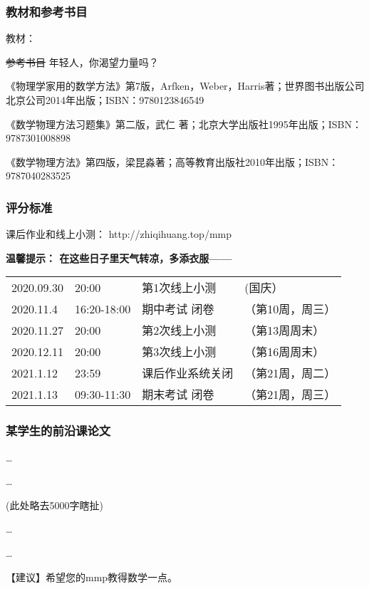 \documentclass[CJK,13pt]{beamer}
\date{}
\begin{document}
  \bch
{}


\begin{frame}
\frametitle{教材和参考书目}

教材：

\skiplines

\sout{参考书目} 年轻人，你渴望力量吗？
\bitem
\item{《物理学家用的数学方法》第7版，Arfken，Weber，Harris著；世界图书出版公司北京公司2014年出版；ISBN：9780123846549}
\item{《数学物理方法习题集》第二版，武仁 著；北京大学出版社1995年出版；ISBN：9787301008898}
\item{《数学物理方法》第四版，梁昆淼著；高等教育出版社2010年出版；ISBN：9787040283525}
\eitem
      
\end{frame}




\begin{frame}
\frametitle{评分标准}


\skipline

课后作业和线上小测： http://zhiqihuang.top/mmp

\skipline

{\bf 温馨提示： 在这些日子里天气转凉，多添衣服——}

\skipline
{\small 
\begin{tabular}{llll}
2020.09.30 &20:00 & 第1次线上小测 & (国庆）\\    
2020.11.4 & 16:20-18:00 & 期中考试 闭卷 & （第10周，周三）\\
2020.11.27 &20:00 & 第2次线上小测 & （第13周周末）\\
2020.12.11 & 20:00 & 第3次线上小测 & （第16周周末）\\      
2021.1.12 &  23:59   &    课后作业系统关闭 & （第21周，周二） \\
2021.1.13 &  09:30-11:30 & 期末考试 闭卷 & （第21周，周三）
\end{tabular}
}
\end{frame}



\begin{frame}
  \frametitle{某学生的前沿课论文}
  
  \ldots

  \ldots  

  (此处略去5000字瞎扯)
  
  \ldots

  \ldots
  
【建议】希望您的mmp教得数学一点。

  
\end{frame}
\end{document}

